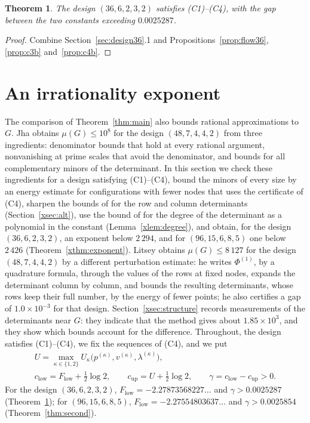\documentclass[11pt]{article}
\newtheorem{theorem}{Theorem}
\theoremstyle{definition}
\begin{document}
\begin{theorem}\label{thm:third}
The design $(36,6,2,3,2)$ satisfies (C1)--(C4), with the gap between the two constants exceeding $0.0025287$.
\end{theorem}

\begin{proof}
Combine Section~\ref{sec:design36}.1 and Propositions~\ref{prop:flow36}, \ref{prop:c3b} and~\ref{prop:c4b}.
\end{proof}


\section{An irrationality exponent}\label{sec:exponent}

The comparison of Theorem~\ref{thm:main} also bounds rational approximations to $G$. Jha \cite{Jha} obtains $\mu(G)\le10^8$ for the design $(48,7,4,4,2)$ from three ingredients: denominator bounds that hold at every rational argument, nonvanishing at prime scales that avoid the denominator, and bounds for all complementary minors of the determinant. In this section we check these ingredients for a design satisfying (C1)--(C4), bound the minors of every size by an energy estimate for configurations with fewer nodes that uses the certificate of (C4), sharpen the bounds of \cite{Jha} for the row and column determinants (Section~\ref{xsec:alt}), use the bound of \cite{Litsey} for the degree of the determinant as a polynomial in the constant (Lemma~\ref{xlem:degree}), and obtain, for the design $(36,6,2,3,2)$, an exponent below $2\,294$, and for $(96,15,6,8,5)$ one below $2\,426$ (Theorem~\ref{xthm:exponent}). Litsey \cite{Litsey} obtains $\mu(G)\le8\,127$ for the design $(48,7,4,4,2)$ by a different perturbation estimate: he writes $\Phi^{(1)}$, by a quadrature formula, through the values of the rows at fixed nodes, expands the determinant column by column, and bounds the resulting determinants, whose rows keep their full number, by the energy of fewer points; he also certifies a gap of $1.0\times10^{-3}$ for that design. Section~\ref{xsec:structure} records measurements of the determinants near $G$: they indicate that the method gives about $1.85\times10^3$, and they show which bounds account for the difference. Throughout, the design satisfies (C1)--(C4), we fix the sequences of (C4), and we put
\begin{gather*}
U=\max_{\kappa\in\{1,2\}}U_\kappa\big(p^{(\kappa)},v^{(\kappa)},\lambda^{(\kappa)}\big),\\
c_{\mathrm{low}}=F_{\mathrm{low}}+\tfrac12\log2,\qquad c_{\mathrm{up}}=U+\tfrac12\log2,\qquad \gamma=c_{\mathrm{low}}-c_{\mathrm{up}}>0 .
\end{gather*}
For the design $(36,6,2,3,2)$, $F_{\mathrm{low}}=-2.27873568227\ldots$ and $\gamma>0.0025287$ (Theorem~\ref{thm:third}); for $(96,15,6,8,5)$, $F_{\mathrm{low}}=-2.27554803637\ldots$ and $\gamma>0.0025854$ (Theorem~\ref{thm:second}).
\end{document}
